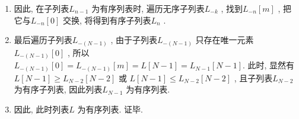 \documentclass[12pt,a4paper]{ctexart}
\begin{document}
\begin{enumerate}
        \item 因此, 在子列表$ L_{n-1} $ 为有序列表时, 遍历无序子列表$ L_{-k} $ , 找到$ L_{-n}[m] $ , 把它与$ L_{-n}[0] $ 交换, 将得到有序子列表$ L_n $ .
        \item 最后遍历子列表$ L_{-(N-1)} $ , 由于子列表$ L_{-(N-1)} $ 只存在唯一元素$ L_{-(N-1)}[0] $ , 所以\\$ L_{-(N-1)}[0]=L_{-(N-1)}[m]=L[N-1]=L_{N-1}[N-1] $. 此时, 显然有 $ L[N-1]\ge L_{N-2}[N-2] $ 或 $ L[N-1]\le L_{N-2}[N-2] $ , 且子列表$ L_{N-2} $ 为有序子列表, 因此列表$ L_{N-1} $ 为有序列表.
        \item 因此, 此时列表$ L $ 为有序列表. 证毕.  
    \end{enumerate}
\end{document}
